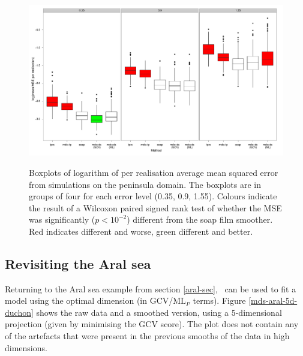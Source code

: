 \begin{figure}
\centering
\includegraphics[width=6in]{mds/figs/wt2-boxplot-duchon.pdf} \\
\caption{Boxplots of logarithm of per realisation average mean squared error from simulations on the peninsula domain. The boxplots are in groups of four for each error level (0.35, 0.9, 1.55). Colours indicate the result of a Wilcoxon paired signed rank test of whether the MSE was significantly ($p<10^{-2}$) different from the soap film smoother. Red indicates different and worse, green different and better.}
\label{wt2-boxplot-duchon}
\end{figure}


\subsection{Revisiting the Aral sea}
\label{aral-revisit}
Returning to the Aral sea example from section \ref{aral-sec}, \mdsds\ can be used to fit a model using the optimal dimension (in GCV/$\text{ML}_P$ terms). Figure \ref{mds-aral-5d-duchon} shows the raw data and a smoothed version, using a 5-dimensional projection (given by minimising the GCV score). The plot does not contain any of the artefacts that were present in the previous smooths of the data in high dimensions.

